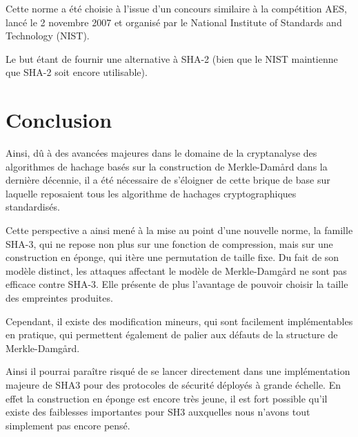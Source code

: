 \documentclass[10.5pt, a4paper, twoside, openright]{report}
\begin{document}
Cette norme a été choisie à l'issue d'un concours similaire à la compétition AES, lancé le 2 novembre 2007 et organisé par le National Institute of Standards and Technology (NIST).

Le but étant de fournir une alternative à SHA-2 (bien que le NIST maintienne que SHA-2 soit encore utilisable).
\chapter{Conclusion}

Ainsi, dû à des avancées majeures dans le domaine de la cryptanalyse des algorithmes de hachage basés sur la construction de Merkle-Dam\r{a}rd dans la dernière décennie, il a été nécessaire de s'éloigner de cette brique de base sur laquelle reposaient tous les algorithme de hachages cryptographiques standardisés.

Cette perspective a ainsi mené à la mise au point d'une nouvelle norme, la famille SHA-3, qui ne repose non plus sur une fonction de compression, mais sur une construction en éponge, qui itère une permutation de taille fixe. Du fait de son modèle distinct, les attaques affectant le modèle de Merkle-Damg\r{a}rd ne sont pas efficace contre SHA-3. Elle présente de plus l'avantage de pouvoir choisir la taille des empreintes produites. 

Cependant, il existe des modification mineurs, qui sont facilement implémentables en pratique, qui permettent également de palier aux défauts de la structure de Merkle-Damg\r{a}rd.

Ainsi il pourrai paraître risqué de se lancer directement dans une implémentation majeure de SHA3 pour des protocoles de sécurité déployés à grande échelle.
En effet la construction en éponge est encore très jeune, il est fort possible qu'il existe des faiblesses importantes pour SH3 auxquelles nous n'avons tout simplement pas encore pensé.
\end{document}
